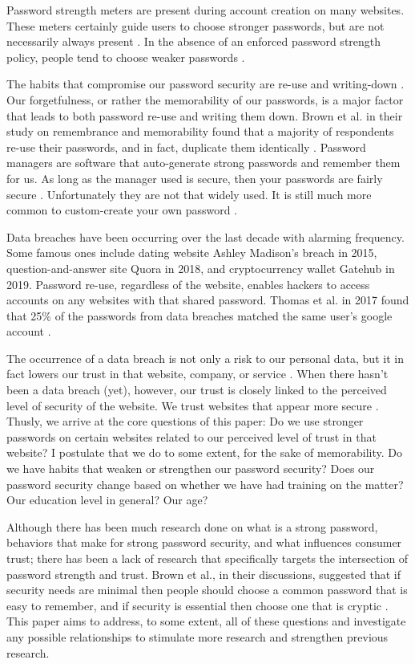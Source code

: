 \documentclass[letterpaper, 10 pt, conference]{ieeeconf}  %
\begin{document}
Password strength meters are present during account creation on many websites. These meters certainly guide users to choose stronger passwords, but are not necessarily always present \cite{DeCarnavalet2014}. In the absence of an enforced password strength policy, people tend to choose weaker passwords \cite{DellAmico2010}. 

The habits that compromise our password security are re-use and writing-down \cite{Dhamija2000}. Our forgetfulness, or rather the memorability of our passwords, is a major factor that leads to both password re-use and writing them down. Brown et al. in their study on remembrance and memorability found that a majority of respondents re-use their passwords, and in fact, duplicate them identically \cite{Brown2004}. Password managers are software that auto-generate strong passwords and remember them for us. As long as the manager used is secure, then your passwords are fairly secure \cite{Alkadi2016}. Unfortunately they are not that widely used. It is still much more common to custom-create your own password \cite{Alkadi2016}.

Data breaches have been occurring over the last decade with alarming frequency. Some famous ones include dating website Ashley Madison’s breach in 2015, question-and-answer site Quora in 2018, and cryptocurrency wallet Gatehub in 2019. Password re-use, regardless of the website, enables hackers to access accounts on any websites with that shared password. Thomas et al. in 2017 found that 25\% of the passwords from data breaches matched the same user’s google account \cite{Thomas2017}. 

The occurrence of a data breach is not only a risk to our personal data, but it in fact lowers our trust in that website, company, or service \cite{Curtis2018}. When there hasn’t been a data breach (yet), however, our trust is closely linked to the perceived level of security of the website. We trust websites that appear more secure \cite{Flavian2006}.
Thusly, we arrive at the core questions of this paper: Do we use stronger passwords on certain websites related to our perceived level of trust in that website? I postulate that we do to some extent, for the sake of memorability. Do we have habits that weaken or strengthen our password security? Does our password security change based on whether we have had training on the matter? Our education level in general? Our age? 

Although there has been much research done on what is a strong password, behaviors that make for strong password security, and what influences consumer trust; there has been a lack of research that specifically targets the intersection of password strength and trust. Brown et al., in their discussions, suggested that if security needs are minimal then people should choose a common password that is easy to remember, and if security is essential then choose one that is cryptic \cite{Brown2004}. This paper aims to address, to some extent, all of these questions and investigate any possible relationships to stimulate more research and strengthen previous research.
\end{document}
